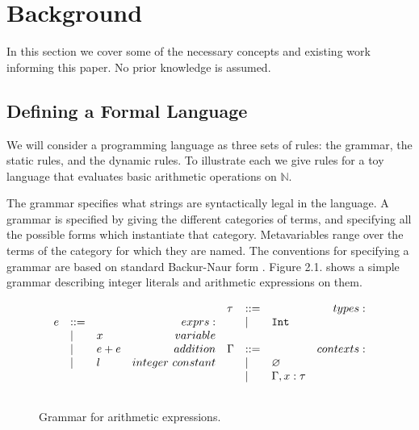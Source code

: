 \chapter{Background}\label{C:background}

In this section we cover some of the necessary concepts and existing work informing this paper. No prior knowledge is assumed.

\section{Defining a Formal Language}

\noindent
We will consider a programming language as three sets of rules: the grammar, the static rules, and the dynamic rules. To illustrate each we give rules for a toy language that evaluates basic arithmetic operations on $\mathbb{N}$.

The grammar specifies what strings are syntactically legal in the language. A grammar is specified by giving the different categories of terms, and specifying all the possible forms which instantiate that category. Metavariables range over the terms of the category for which they are named. The conventions for specifying a grammar are based on standard Backur-Naur form \cite{bnf}. Figure 2.1. shows a simple grammar describing integer literals and arithmetic expressions on them.

\begin{figure}[h]

\[
\begin{array}{c}

\begin{array}{lllr}

e & ::= & ~ & exprs: \\
	& | & x & variable \\
	& | & e + e & addition \\
	& | & l & integer~constant \\
	&&\\

\end{array}

\begin{array}{lllr}

\tau & ::= & ~ & types: \\
	& | & \mathtt{Int} \\
	&&\\
	
\Gamma & ::= & ~ & contexts: \\
	& | & \varnothing \\
	& | & \Gamma, x: \tau \\
	&&\\

\end{array}

\end{array}
\]

\vspace{-7pt}
\caption{Grammar for arithmetic expressions.}
\label{A sample. }
\end{figure}

